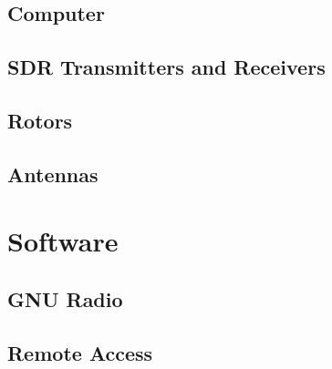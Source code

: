 \documentclass[12pt,a4paper]{article}
\begin{document}
\subsection{Computer}
\subsection{SDR Transmitters and Receivers}
\subsection{Rotors}
\subsection{Antennas}
\section{Software}
\subsection{GNU Radio}
\subsection{Remote Access}
\end{document}
